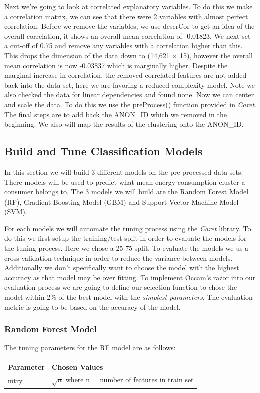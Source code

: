     Next we're going to look at correlated explanatory variables. To do this we make a correlation matrix, we can see that there were 2 variables with almost perfect correlation. Before we remove the variables, we use descrCor to get an idea of the overall correlation, it shows an overall mean correlation of -0.01823. We next set a cut-off of 0.75 and remove any variables with a correlation higher than this. This drops the dimension of the data down to (14,621 $\times$ 15), however the overall mean correlation is now -0.03837 which is marginally higher. Despite the marginal increase in correlation, the removed correlated features are not added back into the data set, here we are favoring a reduced complexity model. Note we also checked the data for linear dependencies and found none.
    Now we can center and scale the data. To do this we use the preProcess() function provided in \textit{Caret}. The final steps are to add back the ANON\_ID which we removed in the beginning. We also will map the results of the clustering onto the ANON\_ID.
    
    
    \subsection{Build and Tune Classification Models}
    In this section we will build 3 different models on the pre-processed data sets. There models will be used to predict what mean energy consumption cluster a consumer belongs to. The 3 models we will build are the Random Forest Model (RF), Gradient Boosting Model (GBM) and Support Vector Machine Model (SVM).
    
    For each models we will automate the tuning process using the \textit{Caret} library. To do this we first setup the training/test split in order to evaluate the models for the tuning process. Here we chose a 25-75 split. To evaluate the models we us a cross-validation technique in order to reduce the variance between models. Additionally we don't specifically want to choose the model with the highest accuracy as that model may be over fitting. To implement Occam's razor into our evaluation process we are going to define our selection function to chose the model within 2\% of the best model with the \textit{simplest parameters}. The evaluation metric is going to be based on the accuracy of the model.
    
    \subsubsection{Random Forest Model}
    The tuning parameters for the RF model are as follows:
        \begin{center}
            \begin{tabular}{|l |l|}
            \hline
             \textbf{Parameter} & \textbf{Chosen Values} \\
             \hline\hline
             mtry & $\sqrt{n}$ where n = number of features in train set \\
             \hline
            \end{tabular}
        \end{center}
    
